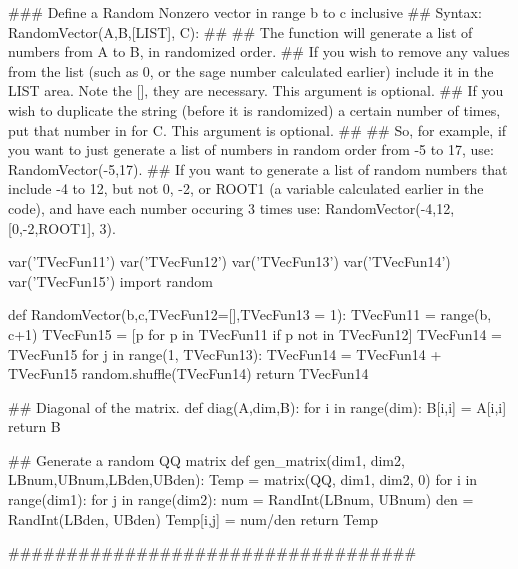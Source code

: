 \begin{sagesilent}
### Define a Random Nonzero vector in range b to c inclusive
## Syntax: RandomVector(A,B,[LIST], C):
##
## The function will generate a list of numbers from A to B, in randomized order. 
## If you wish to remove any values from the list (such as 0, or the sage number calculated earlier) include it in the LIST area. Note the [], they are necessary. This argument is optional.
## If you wish to duplicate the string (before it is randomized) a certain number of times, put that number in for C. This argument is optional.
## 
## So, for example, if you want to just generate a list of numbers in random order from -5 to 17, use: RandomVector(-5,17).
## If you want to generate a list of random numbers that include -4 to 12, but not 0, -2, or ROOT1 (a variable calculated earlier in the code), and have each number occuring 3 times use: RandomVector(-4,12,[0,-2,ROOT1], 3).

var('TVecFun11')
var('TVecFun12')
var('TVecFun13')
var('TVecFun14')
var('TVecFun15')
import random

def RandomVector(b,c,TVecFun12=[],TVecFun13 = 1):
   TVecFun11 = range(b, c+1)
   TVecFun15 = [p for p in TVecFun11 if p not in TVecFun12]
   TVecFun14 = TVecFun15
   for j in range(1, TVecFun13):
      TVecFun14 = TVecFun14 + TVecFun15
   random.shuffle(TVecFun14)
   return TVecFun14

## Diagonal of the matrix.
def diag(A,dim,B):
   for i in range(dim):
      B[i,i] = A[i,i]
   return B
   
   
## Generate a random QQ matrix
def gen_matrix(dim1, dim2, LBnum,UBnum,LBden,UBden):
   Temp = matrix(QQ, dim1, dim2, 0)
   for i in range(dim1):
      for j in range(dim2):
         num = RandInt(LBnum, UBnum)
         den = RandInt(LBden, UBden)
         Temp[i,j] = num/den
   return Temp
   
   
###################################

\end{sagesilent}

